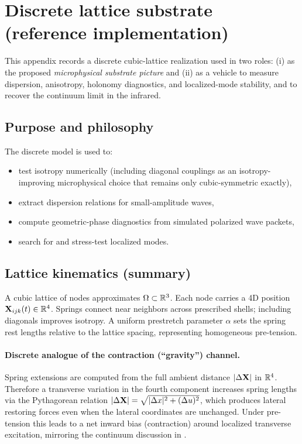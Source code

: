 \section{Discrete lattice substrate (reference implementation)}
\label{app:discrete}

This appendix records a discrete cubic-lattice realization used in two roles:
(i) as the proposed \emph{microphysical substrate picture} and
(ii) as a vehicle to measure dispersion, anisotropy, holonomy diagnostics, and localized-mode stability, and to
recover the continuum limit in the infrared.

\subsection{Purpose and philosophy}

The discrete model is used to:
\begin{itemize}
\item test isotropy numerically (including diagonal couplings as an isotropy-improving microphysical choice that
remains only cubic-symmetric exactly),
\item extract dispersion relations for small-amplitude waves,
\item compute geometric-phase diagnostics from simulated polarized wave packets,
\item search for and stress-test localized modes.
\end{itemize}

\subsection{Lattice kinematics (summary)}

A cubic lattice of nodes approximates $\Omega\subset\mathbb{R}^3$. Each node carries a 4D position $\mathbf{X}_{ijk}(t)\in\mathbb{R}^4$.
Springs connect near neighbors across prescribed shells; including diagonals improves isotropy.
A uniform prestretch parameter $\alpha$ sets the spring rest lengths relative to the lattice spacing,
representing homogeneous pre-tension.


\paragraph{Discrete analogue of the contraction (``gravity'') channel.}
Spring extensions are computed from the full ambient distance $|\Delta \mathbf{X}|$ in $\mathbb{R}^4$.
Therefore a transverse variation in the fourth component increases spring lengths via the Pythagorean relation
$|\Delta \mathbf{X}|=\sqrt{|\Delta x|^2+(\Delta u)^2}$, which produces lateral restoring forces even when the lateral
coordinates are unchanged.
Under pre-tension this leads to a net inward bias (contraction) around localized transverse excitation, mirroring the
continuum discussion in .

